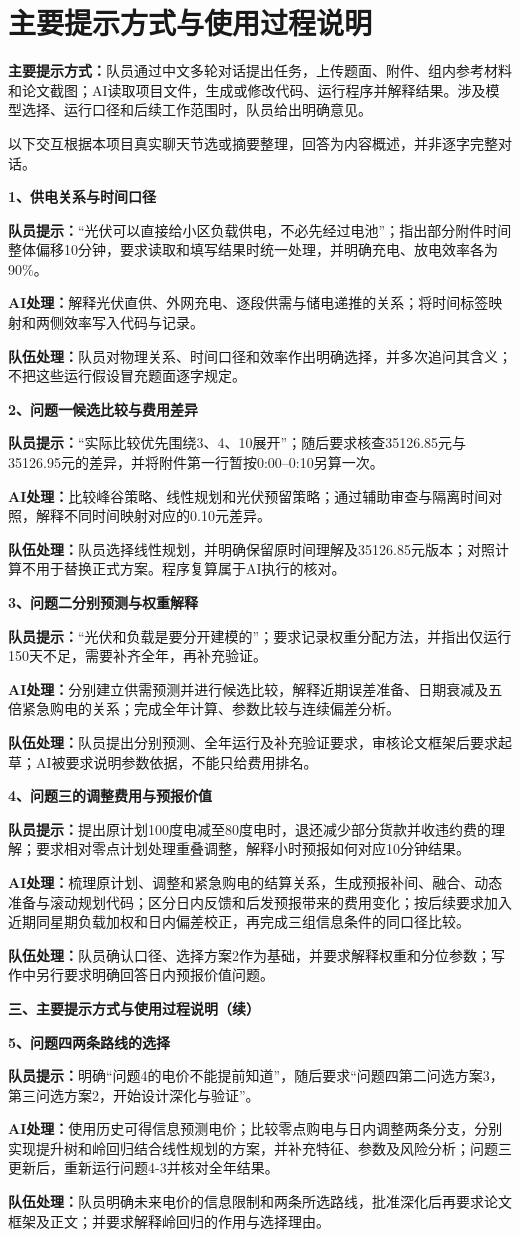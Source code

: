 \documentclass[UTF8,a4paper,12pt]{ctexart}
\newcommand{\field}[2]{\par\noindent\textbf{#1：}#2\par}
\newcommand{\example}[2]{\vspace{6pt}\noindent\textbf{#1、#2}\par}
\begin{document}
\newpage
\section{主要提示方式与使用过程说明}
\field{主要提示方式}{队员通过中文多轮对话提出任务，上传题面、附件、组内参考材料和论文截图；AI读取项目文件，生成或修改代码、运行程序并解释结果。涉及模型选择、运行口径和后续工作范围时，队员给出明确意见。}
以下交互根据本项目真实聊天节选或摘要整理，回答为内容概述，并非逐字完整对话。

\example{1}{供电关系与时间口径}
\field{队员提示}{“光伏可以直接给小区负载供电，不必先经过电池”；指出部分附件时间整体偏移10分钟，要求读取和填写结果时统一处理，并明确充电、放电效率各为90\%。}
\field{AI处理}{解释光伏直供、外网充电、逐段供需与储电递推的关系；将时间标签映射和两侧效率写入代码与记录。}
\field{队伍处理}{队员对物理关系、时间口径和效率作出明确选择，并多次追问其含义；不把这些运行假设冒充题面逐字规定。}

\example{2}{问题一候选比较与费用差异}
\field{队员提示}{“实际比较优先围绕3、4、10展开”；随后要求核查35126.85元与35126.95元的差异，并将附件第一行暂按0:00--0:10另算一次。}
\field{AI处理}{比较峰谷策略、线性规划和光伏预留策略；通过辅助审查与隔离时间对照，解释不同时间映射对应的0.10元差异。}
\field{队伍处理}{队员选择线性规划，并明确保留原时间理解及35126.85元版本；对照计算不用于替换正式方案。程序复算属于AI执行的核对。}

\example{3}{问题二分别预测与权重解释}
\field{队员提示}{“光伏和负载是要分开建模的”；要求记录权重分配方法，并指出仅运行150天不足，需要补齐全年，再补充验证。}
\field{AI处理}{分别建立供需预测并进行候选比较，解释近期误差准备、日期衰减及五倍紧急购电的关系；完成全年计算、参数比较与连续偏差分析。}
\field{队伍处理}{队员提出分别预测、全年运行及补充验证要求，审核论文框架后要求起草；AI被要求说明参数依据，不能只给费用排名。}

\example{4}{问题三的调整费用与预报价值}
\field{队员提示}{提出原计划100度电减至80度电时，退还减少部分货款并收违约费的理解；要求相对零点计划处理重叠调整，解释小时预报如何对应10分钟结果。}
\field{AI处理}{梳理原计划、调整和紧急购电的结算关系，生成预报补间、融合、动态准备与滚动规划代码；区分日内反馈和后发预报带来的费用变化；按后续要求加入近期同星期负载加权和日内偏差校正，再完成三组信息条件的同口径比较。}
\field{队伍处理}{队员确认口径、选择方案2作为基础，并要求解释权重和分位参数；写作中另行要求明确回答日内预报价值问题。}

\newpage
\noindent\textbf{三、主要提示方式与使用过程说明（续）}

\example{5}{问题四两条路线的选择}
\field{队员提示}{明确“问题4的电价不能提前知道”，随后要求“问题四第二问选方案3，第三问选方案2，开始设计深化与验证”。}
\field{AI处理}{使用历史可得信息预测电价；比较零点购电与日内调整两条分支，分别实现提升树和岭回归结合线性规划的方案，并补充特征、参数及风险分析；问题三更新后，重新运行问题4-3并核对全年结果。}
\field{队伍处理}{队员明确未来电价的信息限制和两条所选路线，批准深化后再要求论文框架及正文；并要求解释岭回归的作用与选择理由。}
\end{document}

